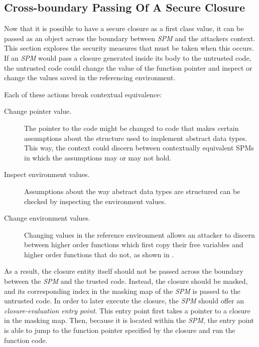 \subsection{Cross-boundary Passing Of A Secure Closure }
Now that it is possible to have a secure closure as a first class value, it can be passed as an object across the boundary between \emph{SPM} and the attackers context.
This section explores the security measures that must be taken when this occurs.
If an \emph{SPM} would pass a closure generated inside its body to the untrusted code, the untrusted code could change the value of the function pointer and inspect or change the values saved in the referencing environment.

Each of these actions break contextual equivalence:
\begin{description}
\item[Change pointer value.] The pointer to the code might be changed to code that makes certain assumptions about the structure used to implement abstract data types.
This way, the context could discern between contextually equivalent SPMs in which the assumptions may or may not hold. 
\item[Inspect environment values.]
Assumptions about the way abstract data types are structured can be checked by inspecting the environment values. 
\item[Change environment values.] Changing values in the reference environment allows an attacker to discern between higher order functions which first copy their free variables and higher order functions that do not, as shown in .
\end{description}

As a result, the closure entity itself should not be passed across the boundary between the \emph{SPM} and the trusted code.
Instead, the closure should be masked, and its corresponding index in the masking map of the \emph{SPM} is passed to the untrusted code.
In order to later execute the closure, the \emph{SPM} should offer an \emph{closure-evaluation entry point}.
This entry point first takes a pointer to a closure in the masking map.
Then, because it is located within the \emph{SPM}, the entry point is able to jump to the function pointer specified by the closure and run the function code.

